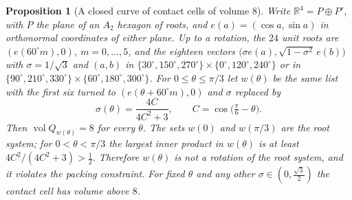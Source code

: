 \documentclass[11pt,reqno]{amsart}
\renewcommand{\_}{\origunderscore\allowbreak}
\numberwithin{equation}{section}
\theoremstyle{plain}
\newtheorem{prop}[thm]{Proposition}
\theoremstyle{definition}
\theoremstyle{remark}
\DeclareMathOperator{\vol}{vol}
\begin{document}
\begin{prop}[A closed curve of contact cells of volume $8$]\label{prop:hexagon-loop}
Write $\mathbb{R}^4=P\oplus P'$, with $P$ the plane of an $A_2$ hexagon of
roots, and $e(a)=(\cos a,\sin a)$ in orthonormal coordinates of either
plane. Up to a rotation, the $24$ unit roots are $(e(60^\circ m),0)$,
$m=0,\dots,5$, and the eighteen vectors
$\bigl(\sigma e(a),\sqrt{1-\sigma^2}\,e(b)\bigr)$ with $\sigma=1/\sqrt3$ and
$(a,b)$ in $\{30^\circ,150^\circ,270^\circ\}\times\{0^\circ,120^\circ,240^\circ\}$
or in $\{90^\circ,210^\circ,330^\circ\}\times\{60^\circ,180^\circ,300^\circ\}$.
For $0\le\theta\le\pi/3$ let $w(\theta)$ be the same list with the first six
turned to $(e(\theta+60^\circ m),0)$ and $\sigma$ replaced by
\[
  \sigma(\theta)=\frac{4C}{4C^2+3},\qquad C=\cos\bigl(\tfrac\pi6-\theta\bigr).
\]
Then $\vol Q_{w(\theta)}=8$ for every $\theta$. The sets $w(0)$ and
$w(\pi/3)$ are the root system; for $0<\theta<\pi/3$ the largest inner
product in $w(\theta)$ is at least $4C^2/(4C^2+3)>\frac12$. Therefore $w(\theta)$ is not a rotation of the root system,
and it violates the packing constraint. For fixed $\theta$ and any other
$\sigma\in(0,\frac{\sqrt3}2)$ the contact cell has volume above $8$.
\end{prop}
\end{document}
